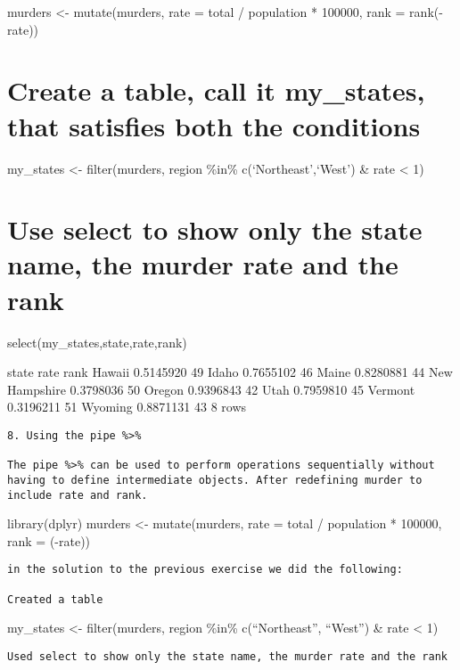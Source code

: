 \documentclass[
]{article}
\begin{document}
murders \textless- mutate(murders, rate = total / population * 100000,
rank = rank(-rate))

\hypertarget{create-a-table-call-it-my_states-that-satisfies-both-the-conditions}{%
\section{Create a table, call it my\_states, that satisfies both the
conditions}\label{create-a-table-call-it-my_states-that-satisfies-both-the-conditions}}

my\_states \textless- filter(murders, region \%in\%
c(`Northeast',`West') \& rate \textless{} 1)

\hypertarget{use-select-to-show-only-the-state-name-the-murder-rate-and-the-rank}{%
\section{Use select to show only the state name, the murder rate and the
rank}\label{use-select-to-show-only-the-state-name-the-murder-rate-and-the-rank}}

select(my\_states,state,rate,rank)

state rate rank Hawaii 0.5145920 49 Idaho 0.7655102 46 Maine 0.8280881
44 New Hampshire 0.3798036 50 Oregon 0.9396843 42 Utah 0.7959810 45
Vermont 0.3196211 51 Wyoming 0.8871131 43 8 rows

\begin{verbatim}
8. Using the pipe %>%

The pipe %>% can be used to perform operations sequentially without having to define intermediate objects. After redefining murder to include rate and rank.
\end{verbatim}

library(dplyr) murders \textless- mutate(murders, rate = total /
population * 100000, rank = (-rate))

\begin{verbatim}
in the solution to the previous exercise we did the following:

Created a table
\end{verbatim}

my\_states \textless- filter(murders, region \%in\% c(``Northeast'',
``West'') \& rate \textless{} 1)

\begin{verbatim}
Used select to show only the state name, the murder rate and the rank
\end{verbatim}
\end{document}
